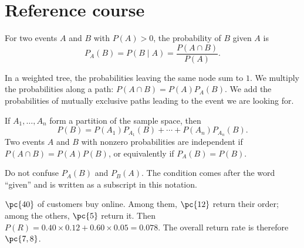 
\section{Reference course}
For two events $A$ and $B$ with $P(A)>0$, the probability of $B$ given $A$ is
\[
P_A(B)=P(B\mid A)=\frac{P(A\cap B)}{P(A)}.
\]

\begin{center}
\end{center}

\begin{keypoint}
In a weighted tree, the probabilities leaving the same node sum to $1$. We multiply the probabilities along a path: $P(A\cap B)=P(A)P_A(B)$. We add the probabilities of mutually exclusive paths leading to the event we are looking for.
\end{keypoint}

If $A_1,\ldots,A_n$ form a partition of the sample space, then
\[
P(B)=P(A_1)P_{A_1}(B)+\cdots+P(A_n)P_{A_n}(B).
\]
Two events $A$ and $B$ with nonzero probabilities are independent if $P(A\cap B)=P(A)P(B)$, or equivalently if $P_A(B)=P(B)$.

\begin{pitfall}
Do not confuse $P_A(B)$ and $P_B(A)$. The condition comes after the word ``given'' and is written as a subscript in this notation.
\end{pitfall}

\begin{example}
$\pc{40}$ of customers buy online. Among them, $\pc{12}$ return their order; among the others, $\pc{5}$ return it. Then $P(R)=\num{0,40}\times\num{0,12}+\num{0,60}\times\num{0,05}=\num{0,078}$. The overall return rate is therefore $\pc{7,8}$.
\end{example}

